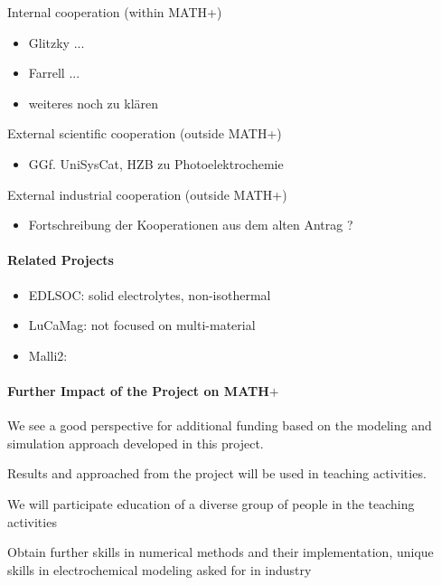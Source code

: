 \documentclass[a4paper,10pt]{article}
\begin{document}
Internal cooperation (within MATH+)
\begin{itemize}
\item Glitzky ...
\item Farrell ...
\item weiteres noch zu klären
\end{itemize}

External scientific cooperation (outside MATH+)
\begin{itemize}
\item GGf. UniSysCat, HZB zu Photoelektrochemie
\end{itemize}

External industrial cooperation (outside MATH+)
\begin{itemize}
\item Fortschreibung der Kooperationen aus dem alten Antrag ?
\end{itemize}

\paragraph{Related Projects}
\begin{itemize}
\item EDLSOC: solid electrolytes, non-isothermal
\item LuCaMag: not focused on multi-material
\item Malli2: 
\end{itemize}

\paragraph{Further Impact of the Project on MATH$+$}
We see a good perspective for additional funding based on the modeling and simulation approach
developed in this project.

Results and approached from the project will be used in teaching activities.

We will participate education of a diverse group of people in the teaching activities

Obtain further skills in numerical methods and their implementation, unique skills in electrochemical
modeling asked for in  industry
\end{document}
